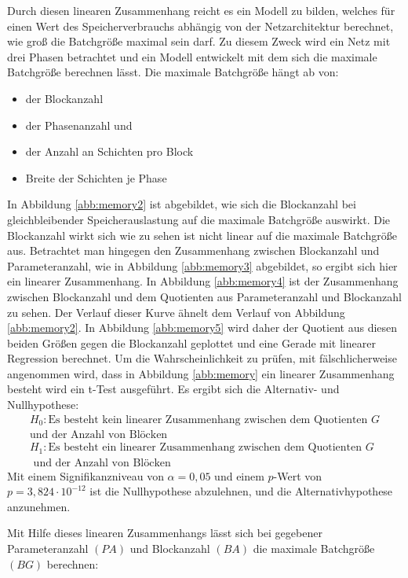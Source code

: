 Durch diesen linearen Zusammenhang reicht es ein Modell zu bilden, welches für einen Wert des Speicherverbrauchs abhängig von der Netzarchitektur berechnet, wie groß die Batchgröße maximal sein darf. Zu diesem Zweck wird ein Netz mit drei Phasen betrachtet und ein Modell entwickelt mit dem sich die maximale Batchgröße berechnen lässt. Die maximale Batchgröße hängt ab von:\color{blue1}

\begin{itemize}
 \item der Blockanzahl
 \item der Phasenanzahl und
 \item der Anzahl an Schichten pro Block
 \item Breite der Schichten je Phase
\end{itemize}
In Abbildung \ref{abb:memory2} ist abgebildet, wie sich die Blockanzahl bei gleichbleibender Speicherauslastung auf die maximale Batchgröße auswirkt. Die Blockanzahl wirkt sich wie zu sehen ist nicht linear auf die maximale Batchgröße aus. Betrachtet man hingegen den Zusammenhang zwischen Blockanzahl und Parameteranzahl, wie in Abbildung \ref{abb:memory3} abgebildet, so ergibt sich hier ein linearer Zusammenhang. In Abbildung \ref{abb:memory4} ist der Zusammenhang zwischen Blockanzahl und dem Quotienten aus Parameteranzahl und Blockanzahl zu sehen. Der Verlauf dieser Kurve ähnelt dem Verlauf von Abbildung \ref{abb:memory2}. In Abbildung \ref{abb:memory5} wird daher der Quotient aus diesen beiden Größen gegen die Blockanzahl geplottet und eine Gerade mit linearer Regression berechnet.
Um die Wahrscheinlichkeit zu prüfen, mit fälschlicherweise angenommen wird, dass in Abbildung \ref{abb:memory} ein linearer Zusammenhang besteht wird ein t-Test ausgeführt.
Es ergibt sich die Alternativ- und Nullhypothese:
\begin{align*}
 H_0: \text{Es besteht kein linearer Zusammenhang zwischen dem Quotienten } G \\
 \text{und der Anzahl von Blöcken} \\
 H_1: \text{Es besteht ein linearer Zusammenhang zwischen dem Quotienten } G \\ 
 \text{ und der Anzahl von Blöcken}
\end{align*}
Mit einem Signifikanzniveau von $\alpha =0,05$ und einem $p$-Wert von $p=3,824 \cdot 10^{-12}$ ist die Nullhypothese abzulehnen, und die Alternativhypothese anzunehmen. 

Mit Hilfe dieses linearen Zusammenhangs lässt sich bei gegebener Parameteranzahl $(PA)$ und Blockanzahl $(BA)$ die maximale Batchgröße $(BG)$ berechnen:

